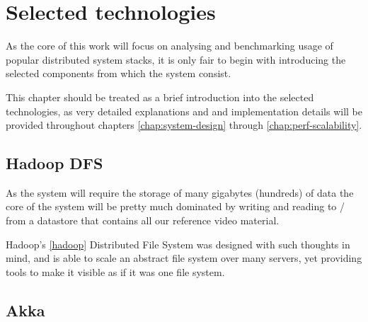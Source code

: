 \chapter{Selected technologies}
As the core of this work will focus on analysing and benchmarking usage of popular distributed system stacks, it is only fair to begin with introducing the selected components from which the system consist.

This chapter should be treated as a brief introduction into the selected technologies, as very detailed explanations and and implementation details will be provided throughout chapters \ref{chap:system-design} through \ref{chap:perf-scalability}.

\section{Hadoop DFS}
As the system will require the storage of many gigabytes (hundreds) of data the core of the system will be pretty much dominated by writing and reading to / from a datastore that contains all our reference video material.

Hadoop's \ref{hadoop} Distributed File System was designed with such thoughts in mind, and is able to scale an abstract file system over many servers, yet providing tools to make it visible as if it was one file system.

\section{Akka}
\label{sec:why-akka}

